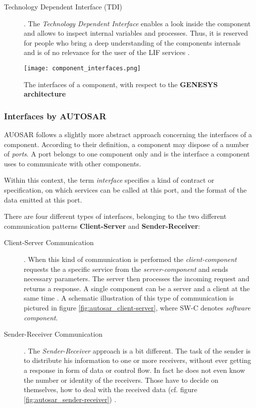 \begin{description}
\item [Technology Dependent Interface (TDI)]. 
The \emph{Technology Dependent Interface} enables a look inside the component and allows to inspect internal variables and processes. Thus, it is reserved for people who bring a deep understanding of the components internals and is of no relevance for the user of the LIF services \cite[p.40-41]{genesys}. 
\end{description}

\begin{figure}[ht]
\centering
\texttt{[image: component\_interfaces.png]}
\caption{The interfaces of a component, with respect to the \textbf{GENESYS architecture} \cite[p.40]{genesys}}
\label{fig:component_interfaces}
\end{figure}


\subsubsection{Interfaces by AUTOSAR}

AUOSAR follows a slightly more abstract approach concerning the interfaces of a component. According to their definition, a component may dispose of a number of \emph{ports}. A port belongs to one component only and is the interface a component uses to communicate with other components.

Within this context, the term \emph{interface} specifies a kind of contract or specification, on which services can be called at this port, and the format of the data emitted at this port.

There are four different types of interfaces, belonging to the two different communication patterns \textbf{Client-Server} and \textbf{Sender-Receiver}: \cite{autosar_intro}

\begin{description}
\item [Client-Server Communication].
When this kind of communication is performed the \emph{client-component} requests the a specific service from the \emph{server-component} and sends necessary parameters. The server then processes the incoming request and returns a response. A single component can be a server and a client at the same time \cite{autosar_intro}. A schematic illustration of this type of communication is pictured in figure \ref{fig:autosar_client-server}, where SW-C denotes \emph{software component}.

\item [Sender-Receiver Communication].
The \emph{Sender-Receiver} approach is a bit different. The task of the sender is to distribute his information to one or more receivers, without ever getting a response in form of data or control flow. In fact he does not even know the number or identity of the receivers. Those have to decide on themselves, how to deal with the received data (cf. figure \ref{fig:autosar_sender-receiver}) \cite{autosar_intro}.
\end{description}

